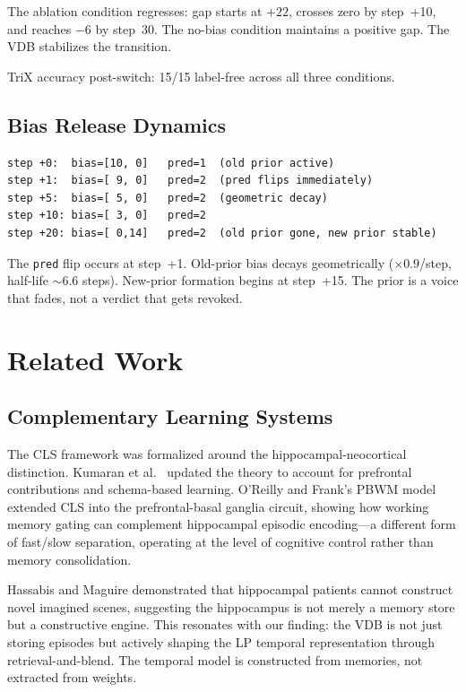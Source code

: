 \documentclass[11pt,letterpaper]{article}
\begin{document}
The ablation condition regresses: gap starts at $+22$, crosses zero by step~+10, and reaches $-6$ by step~30. The no-bias condition maintains a positive gap. The VDB stabilizes the transition.

TriX accuracy post-switch: 15/15 label-free across all three conditions.

\subsection{Bias Release Dynamics}

\begin{lstlisting}
step +0:  bias=[10, 0]   pred=1  (old prior active)
step +1:  bias=[ 9, 0]   pred=2  (pred flips immediately)
step +5:  bias=[ 5, 0]   pred=2  (geometric decay)
step +10: bias=[ 3, 0]   pred=2
step +20: bias=[ 0,14]   pred=2  (old prior gone, new prior stable)
\end{lstlisting}

The \texttt{pred} flip occurs at step~+1. Old-prior bias decays geometrically ($\times 0.9$/step, half-life $\sim$6.6 steps). New-prior formation begins at step~+15. The prior is a voice that fades, not a verdict that gets revoked.

\section{Related Work}

\subsection{Complementary Learning Systems}

The CLS framework \cite{mcclelland1995} was formalized around the hippocampal-neocortical distinction. Kumaran et al.\ \cite{kumaran2016} updated the theory to account for prefrontal contributions and schema-based learning. O'Reilly and Frank's PBWM model \cite{oreilly2006} extended CLS into the prefrontal-basal ganglia circuit, showing how working memory gating can complement hippocampal episodic encoding---a different form of fast/slow separation, operating at the level of cognitive control rather than memory consolidation.

Hassabis and Maguire \cite{hassabis2007} demonstrated that hippocampal patients cannot construct novel imagined scenes, suggesting the hippocampus is not merely a memory store but a constructive engine. This resonates with our finding: the VDB is not just storing episodes but actively shaping the LP temporal representation through retrieval-and-blend. The temporal model is constructed from memories, not extracted from weights.
\end{document}
